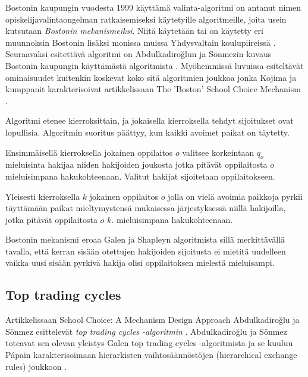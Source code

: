 \documentclass[twoside]{tktltiki}
\begin{document}
Bostonin kaupungin vuodesta 1999 käyttämä valinta-algoritmi on antanut
nimen opiskelijavalintaongelman ratkaisemiseksi käytetyille
algoritmeille, joita usein kutsutaan \emph{Bostonin mekanismeiksi}.
Niitä käytetään tai on käytetty eri muunnoksin Bostonin lisäksi
monissa muissa Yhdysvaltain koulupiireissä \cite{abduson03}.
Seuraavaksi esitettävä algoritmi on Abdulkadiroğlun ja Sönmezin kuvaus
Bostonin kaupungin käyttämästä algoritmista \cite{abduson03}.
Myöhemmissä luvuissa esiteltävät ominaisuudet kuitenkin koskevat koko
sitä algoritmien joukkoa jonka Kojima ja kumppanit karakterisoivat
artikkelissaan The 'Boston' School Choice Mechanism \cite{kojima10}.

Algoritmi etenee kierroksittain, ja jokaisella kierroksella tehdyt
sijoitukset ovat lopullisia. Algoritmin suoritus päättyy, kun kaikki
avoimet paikat on täytetty.

\begin{itemize*}
\item Ensimmäisellä kierroksella jokainen oppilaitos $o$ valitsee
  korkeintaan $q_o$ mieluisinta hakijaa niiden hakijoiden joukosta
  jotka pitävät oppilaitosta $o$ mieluisimpana hakukohteenaan. Valitut
  hakijat sijoitetaan oppilaitokseen.

\item Yleisesti kierroksella $k$ jokainen oppilaitos $o$ jolla on
  vielä avoimia paikkoja pyrkii täyttämään paikat mieltymystensä
  mukaisessa järjestyksessä niillä hakijoilla, jotka pitävät
  oppilaitosta $o$ $k.$ mieluisimpana hakukohteenaan.
\end{itemize*}

Bostonin mekanismi eroaa Galen ja Shapleyn algoritmista sillä
merkittävällä tavalla, että kerran sisään otettujen hakijoiden
sijoitusta ei mietitä uudelleen vaikka uusi sisään pyrkivä hakija
olisi oppilaitoksen mielestä mieluisampi.

\subsection{Top trading cycles}
\label{top_trading_cycles}

Artikkelissaan School Choice: A Mechanism Design Approach
Abdulkadiroğlu ja Sönmez esittelevät \emph{top trading cycles
  -algoritmin} \cite{abduson03}. Abdulkadiroğlu ja Sönmez toteavat
\cite{abduson03} sen olevan yleistys Galen top trading cycles
-algoritmista \cite{shapley74} ja se kuuluu Pápain karakterisoimaan
hierarkisten vaihtosäännöstöjen (hierarchical exchange rules) joukkoon
\cite{papai00}.
\end{document}
